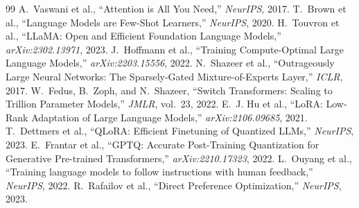 \documentclass[11pt,a4paper]{article}
\begin{document}
\begin{thebibliography}{99}
 A.~Vaswani et al., ``Attention is All You Need,'' \textit{NeurIPS}, 2017.
 T.~Brown et al., ``Language Models are Few-Shot Learners,'' \textit{NeurIPS}, 2020.
 H.~Touvron et al., ``LLaMA: Open and Efficient Foundation Language Models,'' \textit{arXiv:2302.13971}, 2023.
 J.~Hoffmann et al., ``Training Compute-Optimal Large Language Models,'' \textit{arXiv:2203.15556}, 2022.
 N.~Shazeer et al., ``Outrageously Large Neural Networks: The Sparsely-Gated Mixture-of-Experts Layer,'' \textit{ICLR}, 2017.
 W.~Fedus, B.~Zoph, and N.~Shazeer, ``Switch Transformers: Scaling to Trillion Parameter Models,'' \textit{JMLR}, vol.~23, 2022.
 E.~J. Hu et al., ``LoRA: Low-Rank Adaptation of Large Language Models,'' \textit{arXiv:2106.09685}, 2021.
 T.~Dettmers et al., ``QLoRA: Efficient Finetuning of Quantized LLMs,'' \textit{NeurIPS}, 2023.
 E.~Frantar et al., ``GPTQ: Accurate Post-Training Quantization for Generative Pre-trained Transformers,'' \textit{arXiv:2210.17323}, 2022.
 L.~Ouyang et al., ``Training language models to follow instructions with human feedback,'' \textit{NeurIPS}, 2022.
 R.~Rafailov et al., ``Direct Preference Optimization,'' \textit{NeurIPS}, 2023.
\end{thebibliography}
\end{document}
